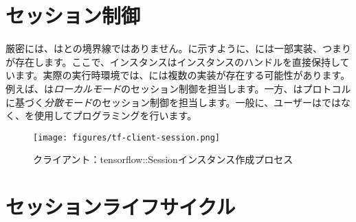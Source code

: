 \section{セッション制御}

\begin{content}

厳密には、はとの境界線ではありません。に示すように、には一部\cpp{}実装、つまりが存在します。ここで、インスタンスはインスタンスのハンドルを直接保持しています。実際の実行時環境では、には複数の実装が存在する可能性があります。例えば、は\emph{ローカルモード}のセッション制御を担当します。一方、はプロトコルに基づく\emph{分散モード}のセッション制御を担当します。一般に、ユーザーはではなく、を使用してプログラミングを行います。

\begin{figure}[!htbp]
\centering
\texttt{[image: figures/tf-client-session.png]}
\caption{クライアント：tensorflow::Sessionインスタンス作成プロセス}
 \label{fig:tf-client-session}
\end{figure}

\end{content}

\section{セッションライフサイクル}

